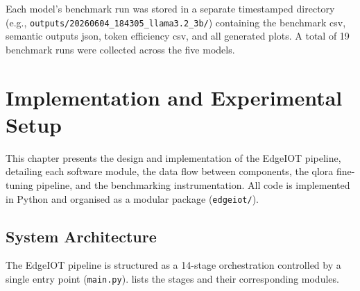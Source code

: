 \documentclass[12pt,a4paper,oneside]{report}
\begin{document}
Each model's benchmark run was stored in a separate timestamped directory (e.g., \texttt{outputs/20260604\_184305\_llama3.2\_3b/}) containing the benchmark \gls{csv}, semantic outputs \gls{json}, token efficiency \gls{csv}, and all generated plots. A total of 19 benchmark runs were collected across the five models.

\chapter{Implementation and Experimental Setup}
\label{ch:implementation}

This chapter presents the design and implementation of the EdgeIOT pipeline, detailing each software module, the data flow between components, the \gls{qlora} fine-tuning pipeline, and the benchmarking instrumentation. All code is implemented in Python and organised as a modular package (\texttt{edgeiot/}).


\section{System Architecture}
\label{sec:impl-architecture}

The EdgeIOT pipeline is structured as a 14-stage orchestration controlled by a single entry point (\texttt{main.py}).  lists the stages and their corresponding modules.
\end{document}
